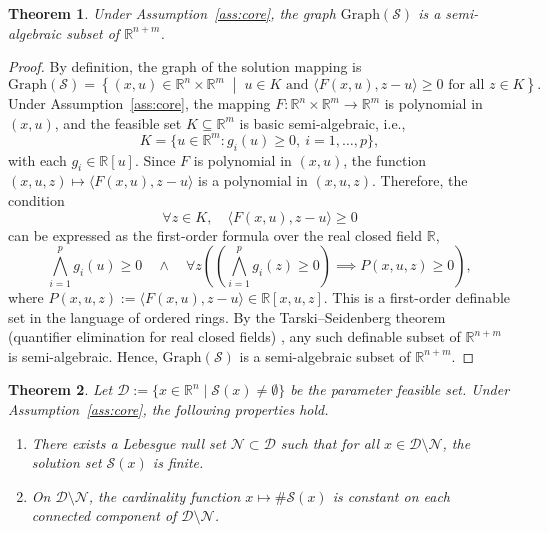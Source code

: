\documentclass[sn-basic,Numbered]{sn-jnl}
\theoremstyle{thmstyleone}%
\newtheorem{theorem}{Theorem}%
\begin{document}
\begin{theorem} \label{thm:eq-semi-graph}
Under Assumption~\ref{ass:core}, the graph $\mathrm{Graph}(\mathcal{S})$ is a semi-algebraic subset of $\mathbb{R}^{n+m}$.
\end{theorem}
\begin{proof}
By definition, the graph of the solution mapping is
\[ \mathrm{Graph}(\mathcal{S}) = \left\{ (x, u) \in \mathbb{R}^n \times \mathbb{R}^m \;\middle|\; u \in K \text{ and } \langle F(x, u), z - u \rangle \geq 0 \text{ for all } z \in K \right\}. \]
Under Assumption~\ref{ass:core}, the mapping $F : \mathbb{R}^n \times \mathbb{R}^m \to \mathbb{R}^m$ is polynomial in $(x, u)$, and the feasible set $K \subseteq \mathbb{R}^m$ is basic semi-algebraic, i.e.,
\[ K = \{ u \in \mathbb{R}^m : g_i(u) \geq 0,\ i=1,\dots,p \}, \]
with each $g_i \in \mathbb{R}[u]$. Since $F$ is polynomial in $(x,u)$, the function $(x,u,z) \mapsto \langle F(x, u), z - u \rangle$ is a polynomial in $(x,u,z)$. Therefore, the condition
\[ \forall z \in K,\quad \langle F(x, u), z - u \rangle \geq 0 \]
can be expressed as the first-order formula over the real closed field $\mathbb{R}$,
\[ \bigwedge_{i=1}^p g_i(u) \geq 0 \quad \land \quad \forall z \left( \left( \bigwedge_{i=1}^p g_i(z) \geq 0 \right) \implies P(x, u, z) \geq 0 \right), \]
where $P(x, u, z) := \langle F(x, u), z - u \rangle \in \mathbb{R}[x, u, z]$. This is a first-order definable set in the language of ordered rings. By the Tarski–Seidenberg theorem (quantifier elimination for real closed fields) \cite{Bochnak1998}, any such definable subset of $\mathbb{R}^{n+m}$ is semi-algebraic. Hence, $\mathrm{Graph}(\mathcal{S})$ is a semi-algebraic subset of $\mathbb{R}^{n+m}$.
\end{proof}

\begin{theorem}
\label{thm:generic_finiteness}
Let $\mathcal{D} := \{ x \in \mathbb{R}^n \mid \mathcal{S}(x) \neq \emptyset \}$ be the parameter feasible set. Under Assumption~\ref{ass:core}, the following properties hold.
\begin{enumerate}
    \item There exists a Lebesgue null set $\mathcal{N} \subset \mathcal{D}$ such that for all $x \in \mathcal{D} \setminus \mathcal{N}$, the solution set $\mathcal{S}(x)$ is finite.
    \item On $\mathcal{D} \setminus \mathcal{N}$, the cardinality function $x \mapsto \#\mathcal{S}(x)$ is constant on each connected component of $\mathcal{D} \setminus \mathcal{N}$.
\end{enumerate}
\end{theorem}
\end{document}
